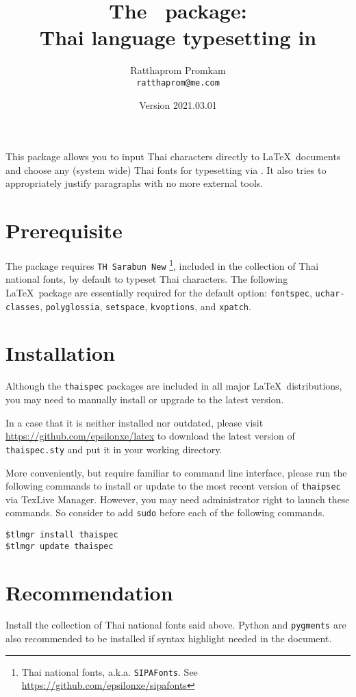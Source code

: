\documentclass{article}
\title{The \pkgname\ package: \\Thai language typesetting in \XeLaTeX}
\author{Ratthaprom Promkam\\{\texttt{\small ratthaprom@me.com}}}
\date{Version 2021.03.01}
\begin{document}
\maketitle

This package allows you to input Thai characters directly to \LaTeX\ documents
and choose any (system wide) Thai fonts for typesetting via \XeLaTeX.
It also tries to appropriately justify paragraphs with no more external tools.

\tableofcontents


\section{Prerequisite}
The package requires \texttt{TH Sarabun New} \footnote{Thai national fonts, a.k.a. \texttt{SIPAFonts}.
See \url{https://github.com/epsilonxe/sipafonts}}, included in the collection of Thai national fonts, by default to typeset Thai characters.
The following \LaTeX\ package are essentially required for the default option: \texttt{fontspec}, \texttt{uchar­classes}, \texttt{poly­glos­sia}, \texttt{setspace}, \texttt{kvop­tions}, and \texttt{xpatch}.

\section{Installation}
Although the \texttt{thaispec} packages are included in all major \LaTeX\ distributions, you may need to manually install or upgrade to the latest version.
 
In a case that it is neither installed nor outdated, please visit \url{https://github.com/epsilonxe/latex} to download the latest version of \texttt{thaispec.sty} and put it in your working directory.

More conveniently, but require familiar to command line interface, 
please run the following commands to install or update to the most recent version of \texttt{thaipsec} via TexLive Manager. 
However, you may need administrator right to launch these commands.
So consider to add \texttt{sudo} before each of the following commands.

\begin{verbatim}
$tlmgr install thaispec 
$tlmgr update thaispec    
\end{verbatim}

\section{Recommendation}
Install the collection of Thai national fonts said above.
Python and \texttt{pygments} are also recommended to be installed if syntax highlight needed in the document.
\end{document}
